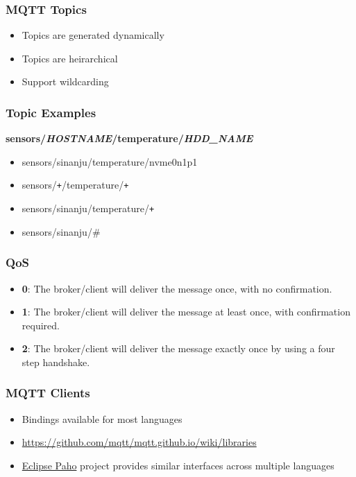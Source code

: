 \documentclass[aspectratio=169,11pt,hyperref={colorlinks=true}]{beamer}
\begin{document}
\begin{frame}
    \frametitle{MQTT Topics}
    \begin{itemize}
        \item Topics are generated dynamically
        \item Topics are heirarchical
        \item Support wildcarding
    \end{itemize}
\end{frame}

\begin{frame}
    \frametitle{Topic Examples}
    \textbf{sensors/\textit{HOSTNAME}/temperature/\textit{HDD\_NAME}}
    \begin{itemize}
        \item sensors/sinanju/temperature/nvme0n1p1
        \item sensors/\texttt{+}/temperature/\texttt{+}
        \item sensors/sinanju/temperature/\texttt{+}
        \item sensors/sinanju/\#
    \end{itemize}
\end{frame}

\begin{frame}
    \frametitle{QoS}
    \begin{itemize}
        \item \textbf{0}: The broker/client will deliver the message once, with no confirmation.
        \item \textbf{1}: The broker/client will deliver the message at least once, with confirmation required.
        \item \textbf{2}: The broker/client will deliver the message exactly once by using a four step handshake.
    \end{itemize}
\end{frame}

\begin{frame}
    \frametitle{MQTT Clients}
    \begin{itemize}
        \item Bindings available for most languages
        \item \href{https://github.com/mqtt/mqtt.github.io/wiki/libraries}{https://github.com/mqtt/mqtt.github.io/wiki/libraries}
        \item \href{https://www.eclipse.org/paho/}{Eclipse Paho} project provides similar interfaces across multiple languages
    \end{itemize}
\end{frame}
\end{document}
